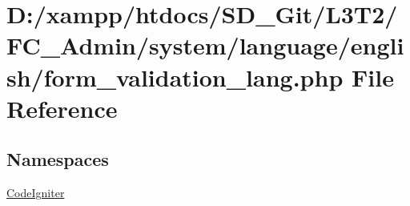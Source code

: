 \hypertarget{_admin_2system_2language_2english_2form__validation__lang_8php}{}\section{D\+:/xampp/htdocs/\+S\+D\+\_\+\+Git/\+L3\+T2/\+F\+C\+\_\+\+Admin/system/language/english/form\+\_\+validation\+\_\+lang.php File Reference}
\label{_admin_2system_2language_2english_2form__validation__lang_8php}
\subsection*{Namespaces}
\begin{DoxyCompactItemize}
\item 
 \hyperlink{namespace_code_igniter}{Code\+Igniter}
\end{DoxyCompactItemize}
